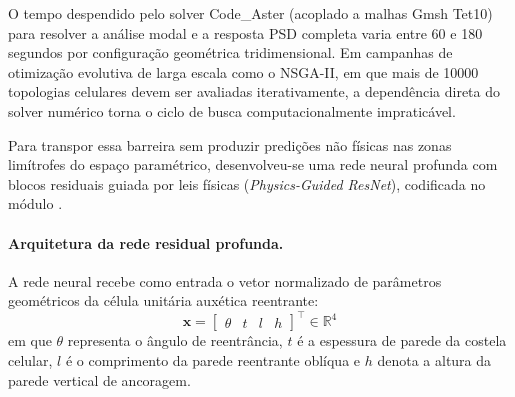 O tempo despendido pelo solver Code\_Aster (acoplado a malhas Gmsh Tet10) para resolver a análise modal e a resposta PSD completa varia entre 60 e 180 segundos por configuração geométrica tridimensional. Em campanhas de otimização evolutiva de larga escala como o NSGA-II, em que mais de \num{10000} topologias celulares devem ser avaliadas iterativamente, a dependência direta do solver numérico torna o ciclo de busca computacionalmente impraticável.

Para transpor essa barreira sem produzir predições não físicas nas zonas limítrofes do espaço paramétrico, desenvolveu-se uma rede neural profunda com blocos residuais guiada por leis físicas (\textit{Physics-Guided ResNet}), codificada no módulo .

\paragraph*{Arquitetura da rede residual profunda.}
\label{par:arquitetura}
A rede neural recebe como entrada o vetor normalizado de parâmetros geométricos da célula unitária auxética reentrante:
\begin{equation}
  \mathbf{x} = \begin{bmatrix} \theta & t & l & h \end{bmatrix}^{\top} \in \mathbb{R}^{4}
  \label{eq:entrada}
\end{equation}
em que $\theta$ representa o ângulo de reentrância, $t$ é a espessura de parede da costela celular, $l$ é o comprimento da parede reentrante oblíqua e $h$ denota a altura da parede vertical de ancoragem.


